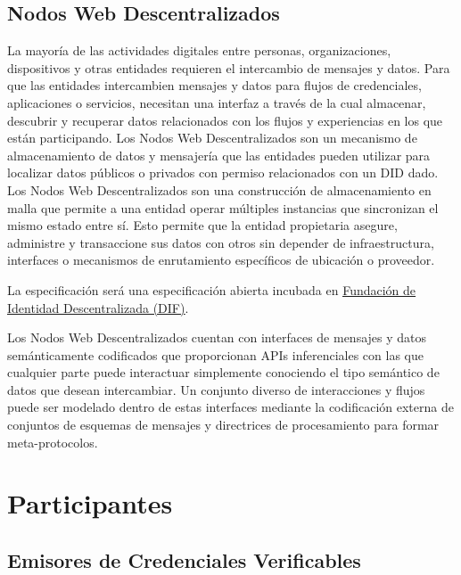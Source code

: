 \documentclass[11pt]{article}
\begin{document}
\vspace{1\baselineskip}
\subsection{Nodos Web Descentralizados}

\vspace{1\baselineskip}
La mayoría de las actividades digitales entre personas, organizaciones, dispositivos y otras entidades requieren el intercambio de mensajes y datos. Para que las entidades intercambien mensajes y datos para flujos de credenciales, aplicaciones o servicios, necesitan una interfaz a través de la cual almacenar, descubrir y recuperar datos relacionados con los flujos y experiencias en los que están participando. Los Nodos Web Descentralizados son un mecanismo de almacenamiento de datos y mensajería que las entidades pueden utilizar para localizar datos públicos o privados con permiso relacionados con un DID dado. Los Nodos Web Descentralizados son una construcción de almacenamiento en malla que permite a una entidad operar múltiples instancias que sincronizan el mismo estado entre sí. Esto permite que la entidad propietaria asegure, administre y transaccione sus datos con otros \textcolor[HTML]{202124}{ }sin depender de infraestructura, interfaces o mecanismos de enrutamiento específicos de ubicación o proveedor.

La especificación será una especificación abierta incubada en
\href{https://identity.foundation/decentralized-web-node/spec/}{\uline{\textcolor[HTML]{1155CC}{Fundación de Identidad Descentralizada (DIF)}}}.

\vspace{1\baselineskip}
Los Nodos Web Descentralizados cuentan con interfaces de mensajes y datos semánticamente codificados que proporcionan APIs inferenciales con las que cualquier parte puede interactuar simplemente conociendo el tipo semántico de datos que desean intercambiar. Un conjunto diverso de interacciones y flujos puede ser modelado dentro de estas interfaces mediante la codificación externa de conjuntos de esquemas de mensajes y directrices de procesamiento para formar meta-protocolos.

\section{Participantes}

\vspace{1\baselineskip}
\subsection{Emisores de Credenciales Verificables}
\end{document}
